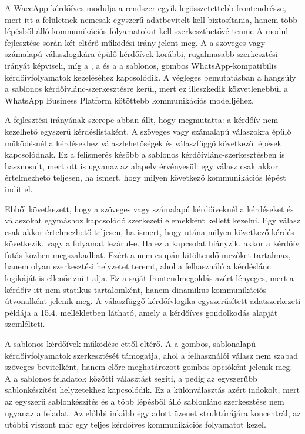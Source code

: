 A WaccApp kérdőíves modulja a rendszer egyik legösszetettebb frontendrésze, mert itt a felületnek nemcsak egyszerű adatbevitelt kell biztosítania, hanem több lépésből álló kommunikációs folyamatokat kell szerkeszthetővé tennie A modul fejlesztése során két eltérő működési irány jelent meg. A  a szöveges vagy számalapú válaszlogikára épülő kérdőívek korábbi, rugalmasabb szerkesztési irányát képviseli, míg a , a  és a  a sablonos, gombos WhatsApp-kompatibilis kérdőívfolyamatok kezeléséhez kapcsolódik. A végleges bemutatásban a hangsúly a sablonos kérdőívlánc-szerkesztésre kerül, mert ez illeszkedik közvetlenebbül a WhatsApp Business Platform kötöttebb kommunikációs modelljéhez.

A  fejlesztési irányának szerepe abban állt, hogy megmutatta: a kérdőív nem kezelhető egyszerű kérdéslistaként. A szöveges vagy számalapú válaszokra épülő működésnél a kérdésekhez válaszlehetőségek és válaszfüggő következő lépések kapcsolódnak. Ez a felismerés később a sablonos kérdőívlánc-szerkesztésben is hasznosult, mert ott is ugyanaz az alapelv érvényesül: egy válasz csak akkor értelmezhető teljesen, ha ismert, hogy milyen következő kommunikációs lépést indít el.

Ebből következett, hogy a szöveges vagy számalapú kérdőíveknél a kérdéseket és válaszokat egymáshoz kapcsolódó szerkezeti elemekként kellett kezelni. Egy válasz csak akkor értelmezhető teljesen, ha ismert, hogy utána milyen következő kérdés következik, vagy a folyamat lezárul-e. Ha ez a kapcsolat hiányzik, akkor a kérdőív futás közben megszakadhat. Ezért a  nem csupán kitöltendő mezőket tartalmaz, hanem olyan szerkesztési helyzetet teremt, ahol a felhasználó a kérdéslánc logikáját is ellenőrizni tudja. Ez a saját frontendmegoldás azért lényeges, mert a kérdőív itt nem statikus tartalomként, hanem dinamikus kommunikációs útvonalként jelenik meg. A válaszfüggő kérdőívlogika egyszerűsített adatszerkezeti példája a 15.4. mellékletben látható, amely a kérdőíves gondolkodás alapját szemlélteti.

A sablonos kérdőívek működése ettől eltérő. A  a gombos, sablonalapú kérdőívfolyamatok szerkesztését támogatja, ahol a felhasználói válasz nem szabad szöveges bevitelként, hanem előre meghatározott gombos opcióként jelenik meg. A  a sablonos feladatok közötti választást segíti, a  pedig az egyszerűbb sablonkészítési helyzetekhez kapcsolódik. Ez a különválasztás azért indokolt, mert az egyszerű sablonkészítés és a több lépésből álló sablonlánc szerkesztése nem ugyanaz a feladat. Az előbbi inkább egy adott üzenet struktúrájára koncentrál, az utóbbi viszont már egy teljes kérdőíves kommunikációs folyamatot kezel. 

